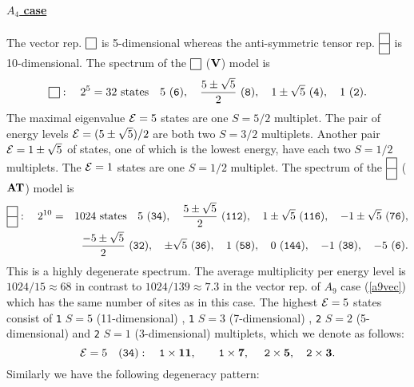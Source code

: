 \documentclass[a4paper,12pt]{article}
\def\sqr#1#2{{\vcenter{\hrule height.#2pt
      \hbox{\vrule width.#2pt height#1pt \kern#1pt
          \vrule width.#2pt}
      \hrule height.#2pt}}}
\def\twosqr#1#2{{\vcenter{\hrule height.#2pt
      \hbox{\vrule width.#2pt height#1pt \kern#1pt
          \vrule width.#2pt}
      \hrule height.#2pt
      \hbox{\vrule width.#2pt height#1pt \kern#1pt
          \vrule width.#2pt}
      \hrule height.#2pt}}}
\begin{document}
\paragraph{\underline{$A_4$ case}} The vector rep.
$\sqr{9}5$ is 5-dimensional
whereas the anti-symmetric tensor rep. $\twosqr{9}5$ is 10-dimensional.
The spectrum of the $\sqr{9}5$ (${\bf V}$) model is
\begin{equation}
\sqr{9}5:\quad 2^5=32\ \mbox{states}\quad 5\ ({\tt 6}),
\quad {5\pm\sqrt{5}\over2}\
({\tt 8}),\quad 1\pm\sqrt{5}\ ({\tt 4}),\quad 1\ ({\tt 2}).
\label{a4v}
\end{equation}
The maximal eigenvalue ${\cal E}=5$ states are one $S=5/2$ multiplet.
The pair of energy levels ${\cal E}=(5\pm\sqrt{5})/2$ are both two $S=3/2$
multiplets.
Another pair ${\cal E}=1\pm\sqrt{5}$ of states, one of which is the
lowest energy,
have  each two $S=1/2$ multiplets. The ${\cal E}=1$ states are one $S=1/2$
multiplet. The spectrum of the $\twosqr{9}5$  (${\bf AT}$) model is
\begin{eqnarray}
\twosqr{9}5:\quad 2^{10}&=&1024\ \mbox{states}\quad 5\ ({\tt 34}),\quad
{5\pm\sqrt{5}\over2}\ ({\tt 112}),\quad 1\pm\sqrt{5}\ ({\tt 116}),\quad
-1\pm\sqrt{5}\ ({\tt 76}),\nonumber\\
&& {-5\pm\sqrt{5}\over2}\ ({\tt 32}),\quad \pm\sqrt{5}\ ({\tt 36}),
\quad 1\ ({\tt
58}),\quad 0\ ({\tt 144}),\quad -1\ ({\tt 38}),\quad -5\ ({\tt 6}).
\end{eqnarray}
This is a highly degenerate spectrum.
The average multiplicity per energy level is
$1024/15\approx68$ in contrast to
$1024/139\approx 7.3$ in the vector rep. of $A_9$ case
(\ref{a9vec}) which has the
same number of sites as in this case. The
highest
${\cal E}=5$ states consist of {\tt 1} $S=5$ (11-dimensional) , {\tt 1}
$S=3$
(7-dimensional) , {\tt 2}
$S=2$ (5-dimensional)  and {\tt 2}
$S=1$ (3-dimensional) multiplets, which we denote as follows:
\begin{equation}
{\cal E}=5\quad ({\tt 34}):\quad {\tt 1} \times {\bf 11},
\qquad {\tt 1} \times {\bf
7},\quad\ {\tt 2}\times {\bf 5},\quad {\tt 2}\times {\bf 3}.
\end{equation}
Similarly we have the following degeneracy pattern:
\end{document}
